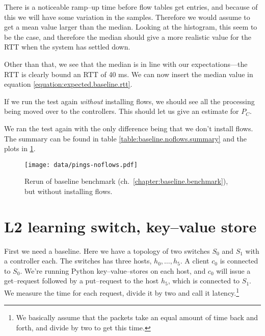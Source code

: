 There is a noticeable ramp--up time before flow tables get entries, and
because of this we will have some variation in the samples. Therefore we
would assume to get a mean value larger than the median.  Looking at the
histogram, this seem to be the case, and therefore the median should give a
more realistic value for the RTT when the system has settled down.

Other than that, we see that the median is in line with our
expectations---the RTT is clearly bound an RTT of 40 ms.  We can now insert
the median value in equation \ref{equation:expected.baseline.rtt}.



If we run the test again \textit{without} installing flows, we should see
all the processing being moved over to the controllers.  This should let us
give an estimate for $P_C$.

We ran the test again  with the only difference being that we don't
install flows.  The summary can be found in table
\ref{table:baseline.noflows.summary} and the plots in
\ref{figure:baseline.noflows.plots}.



\begin{figure}
  \centering
  \texttt{[image: data/pings-noflows.pdf]}
  \caption{Rerun of baseline benchmark
    (ch.~\ref{chapter:baseline.benchmark}), but without installing flows.}
  \label{figure:baseline.noflows.plots}
\end{figure}


\section{L2 learning switch, key--value store}
\label{chapter:benchmark.l2.kv.noflows}

First we need a baseline.  Here we have a topology of two switches $S_0$ and
$S_1$ with a controller each.  The switches has three hosts, $h_0, \dots, h_5$.
A client $c_0$ is connected to $S_0$. We're running Python
key--value--stores on each host, and $c_0$ will issue a get--request
followed by a put--request to the host $h_5$, which is connected to $S_1$.
We measure the time for each request, divide it
by two and call it latency.\footnote{We basically assume that the packets
take an equal amount of time back and forth, and divide by two to get this
time.}

